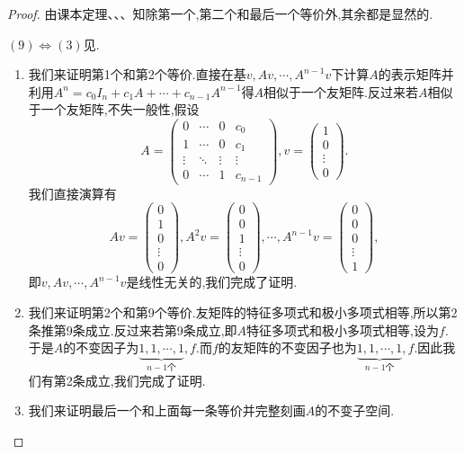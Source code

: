 \documentclass[../../main.tex]{subfiles}
\begin{document}
\begin{proof}
由课本定理、、、知除第一个,第二个和最后一个等价外,其余都是显然的.

$(9)\iff (3)$见.
\begin{enumerate}[(1)]
\item 我们来证明第1个和第2个等价.直接在基$v,Av,\cdots,A^{n-1}v$下计算$A$的表示矩阵并利用$A^n=c_0I_n+c_1A+\cdots+c_{n-1}A^{n-1}$得$A$相似于一个友矩阵.反过来若$A$相似于一个友矩阵,不失一般性,假设
$$A=\begin{pmatrix}0&\cdots&0&c_0\\1&\cdots&0&c_1\\\vdots&\ddots&\vdots&\vdots\\0&\cdots&1&c_{n-1}\end{pmatrix},v=\begin{pmatrix}1\\0\\\vdots\\0\end{pmatrix}.$$
我们直接演算有
$$Av=\begin{pmatrix}0\\1\\0\\\vdots\\0\end{pmatrix},A^2v=\begin{pmatrix}0\\0\\1\\\vdots\\0\end{pmatrix},\cdots,A^{n-1}v=\begin{pmatrix}0\\0\\0\\\vdots\\1\end{pmatrix},$$
即$v,Av,\cdots,A^{n-1}v$是线性无关的,我们完成了证明.

\item 我们来证明第2个和第9个等价.友矩阵的特征多项式和极小多项式相等,所以第2条推第9条成立.反过来若第9条成立,即$A$特征多项式和极小多项式相等,设为$f$.于是$A$的不变因子为$\underbrace{1,1,\cdots,1}_{n-1个},f$.而$f$的友矩阵的不变因子也为$\underbrace{1,1,\cdots,1}_{n-1个},f$.因此我们有第2条成立,我们完成了证明.

\item 我们来证明最后一个和上面每一条等价并完整刻画$A$的不变子空间.


\end{enumerate}
\end{proof}
\end{document}
